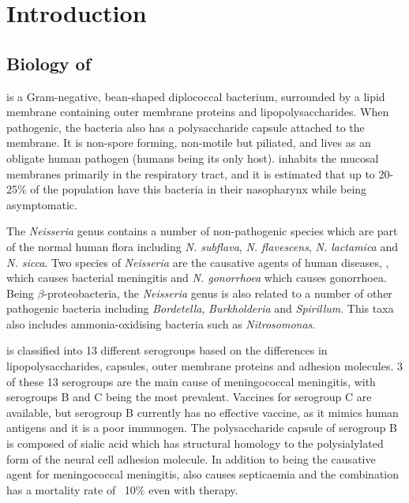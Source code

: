 \chapter{Introduction}
\label{chap:intro}

\section{Biology of \Nsm{}}
\Nsm{} is a Gram-negative, bean-shaped diplococcal bacterium\cite{Deuren2000}, surrounded by a lipid membrane containing outer membrane proteins and lipopolysaccharides\cite{Deuren2000}. When pathogenic, the bacteria also has a polysaccharide capsule attached to the membrane\cite{Deuren2000}. It is non-spore forming, non-motile but piliated, and lives as an obligate human pathogen (humans being its only host)\cite{Stephens2009}. \Nm{} inhabits the mucosal membranes primarily in the respiratory tract, and it is estimated that up to 20-25\% of the population have this bacteria in their nasopharynx while being asymptomatic\cite{Rosenstein2001,Stephens2009,DeVoe1982}.

The \textit{Neisseria} genus contains a number of non-pathogenic species which are part of the normal human flora including \textit{N. subflava},  \textit{N. flavescens},  \textit{N. lactamica} and \textit{N. sicca}\cite{Aas2005}. Two species of \textit{Neisseria} are the causative agents of human diseases, \Nm{}, which causes bacterial meningitis and \textit{N. gonorrhoea} which causes gonorrhoea. Being $\beta$-proteobacteria\cite{Stephens2009}, the \textit{Neisseria} genus is also related to a number of other pathogenic bacteria including \textit{Bordetella}, \textit{Burkholderia} and \textit{Spirillum}. This taxa also includes ammonia-oxidising bacteria such as \textit{Nitrosomonas}\cite{Madigan2005}.

\Nm{} is classified into 13 different serogroups based on the differences in lipopolysaccharides, capsules, outer membrane proteins and adhesion molecules\cite{Stephens2009,Deuren2000,Carbonnelle2009}. 3 of these 13 serogroups are the main cause of meningococcal meningitis, with serogroups B and C being the most prevalent\cite{Deuren2000}. Vaccines for serogroup C are available, but serogroup B currently has no effective vaccine, as it mimics human antigens\cite{Stephens2009} and it is a poor immunogen\cite{Stephens2007}. The polysaccharide capsule of serogroup B is composed of sialic acid which has structural homology to the polysialylated form of the  neural cell adhesion molecule\cite{Holst2007,Moe1999}. In addition to being the causative agent for meningococcal meningitis, \Nm{} also causes septicaemia and the combination has a mortality rate of ~10\% even with therapy\cite{Deuren2000,Stephens2009}.

